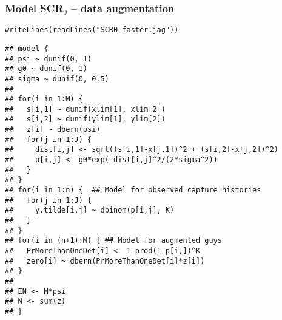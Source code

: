 \documentclass[color=usenames,dvipsnames]{beamer}\usepackage[]{graphicx}\usepackage[]{color}
\makeatletter
\newcommand{\hlstr}[1]{\textcolor[rgb]{0.749,0.012,0.012}{#1}}%
\newcommand{\hlstd}[1]{\textcolor[rgb]{0,0,0}{#1}}%
\newcommand{\hlkwd}[1]{\textcolor[rgb]{0.004,0.004,0.506}{#1}}%
\newenvironment{kframe}{%
 \def\at@end@of@kframe{}%
 \ifinner\ifhmode%
  \def\at@end@of@kframe{\end{minipage}}%
  \begin{minipage}{\columnwidth}%
 \fi\fi%
 \def\FrameCommand##1{\hskip\@totalleftmargin \hskip-\fboxsep
 \colorbox{shadecolor}{##1}\hskip-\fboxsep
     \hskip-\linewidth \hskip-\@totalleftmargin \hskip\columnwidth}%
 \MakeFramed {\advance\hsize-\width
   \@totalleftmargin\z@ \linewidth\hsize
   \@setminipage}}%
 {\par\unskip\endMakeFramed%
 \at@end@of@kframe}
\newenvironment{knitrout}{}{} %
\makeatother
\begin{document}
\begin{frame}[fragile]
  \frametitle{Model SCR$_0$ -- data augmentation}
\vspace{-3pt}
\begin{knitrout}\tiny
{}\color{fgcolor}\begin{kframe}
\begin{alltt}
\hlkwd{writeLines}\hlstd{(}\hlkwd{readLines}\hlstd{(}\hlstr{"SCR0-faster.jag"}\hlstd{))}
\end{alltt}
\begin{verbatim}
## model {
## psi ~ dunif(0, 1)
## g0 ~ dunif(0, 1)
## sigma ~ dunif(0, 0.5)
## 
## for(i in 1:M) {
##   s[i,1] ~ dunif(xlim[1], xlim[2])
##   s[i,2] ~ dunif(ylim[1], ylim[2])
##   z[i] ~ dbern(psi)
##   for(j in 1:J) {
##     dist[i,j] <- sqrt((s[i,1]-x[j,1])^2 + (s[i,2]-x[j,2])^2)
##     p[i,j] <- g0*exp(-dist[i,j]^2/(2*sigma^2))
##   }
## }
## for(i in 1:n) {  ## Model for observed capture histories
##   for(j in 1:J) {
##     y.tilde[i,j] ~ dbinom(p[i,j], K)
##   }
## }
## for(i in (n+1):M) { ## Model for augmented guys
##   PrMoreThanOneDet[i] <- 1-prod(1-p[i,])^K
##   zero[i] ~ dbern(PrMoreThanOneDet[i]*z[i])
## }
## 
## EN <- M*psi
## N <- sum(z)
## }
\end{verbatim}
\end{kframe}
\end{knitrout}
\end{frame}
\end{document}
